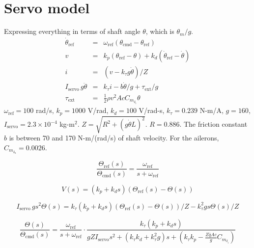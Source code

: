 \documentclass[11pt]{amsart}
\begin{document}
\section{Servo model}
Expressing everything in terms of shaft angle $\theta$, which is $\theta_m / g$.
\begin{eqnarray}
\dot{\theta}_{\mathrm{ref}} &=& \omega_{\mathrm{ref}}
(\theta_{\mathrm{cmd}} - \theta_{\mathrm{ref}}) \\
v &=& k_p (\theta_{\mathrm{ref}} - \theta) +
k_d (\dot{\theta}_{\mathrm{ref}} - \dot{\theta}) \\
i &=& (v - k_{\tau} g \dot{\theta}) / Z \\
I_{\mathrm{servo}}\, g \ddot{\theta} &=& k_{\tau} i - b \dot{\theta} / g +
\tau_{\mathrm{ext}} / g \\
\tau_{\mathrm{ext}} &=& \frac{1}{2} \rho v^2 A c C_{m_{\delta_i}} \theta
\end{eqnarray}
$\omega_{\mathrm{ref}} = 100$ rad/s, $k_p = 1000$ V/rad, $k_d = 100$
V/rad-s, $k_{\tau} = 0.239$ N-m/A, $g = 160$,
$I_{\mathrm{servo}}= 2.3 \times 10^{-4}$ kg-m$^2$.
$Z = \sqrt{R^2 + (g \dot{\theta} L)^2}$.
$R = 0.886$.  The friction constant $b$ is between 70 and 170
N-m/(rad/s) of shaft velocity.  For the ailerons, $C_{m_{\delta_a}} =
0.0026$.

\begin{equation}
\frac{\Theta_{\mathrm{ref}}(s)}{\Theta_{\mathrm{cmd}}(s)} =
\frac{\omega_{\mathrm{ref}}}{s + \omega_{\mathrm{ref}}}
\end{equation}

\begin{equation}
V(s) = (k_p + k_d s) (\Theta_{\mathrm{ref}}(s) - \Theta(s))
\end{equation}

\begin{equation}
I_{\mathrm{servo}}\, g s^2 \Theta(s) =
k_{\tau} (k_p + k_d s) (\Theta_{\mathrm{ref}}(s) - \Theta(s)) / Z -
k_{\tau}^2 g s \Theta(s) / Z
\end{equation}

\begin{equation}
\frac{\Theta(s)}{\Theta_{\mathrm{cmd}}(s)} =
\frac{\omega_{\mathrm{ref}}}{s + \omega_{\mathrm{ref}}}
\cdot
\frac{k_{\tau} (k_p + k_d s)}
{g Z I_{\mathrm{servo}} s^2 + (k_{\tau} k_d + k_{\tau}^2 g) s +
(k_{\tau} k_p - \frac{Z \bar{q} A c}{g} C_{m_{\delta_i}})}
\end{equation}
\end{document}
